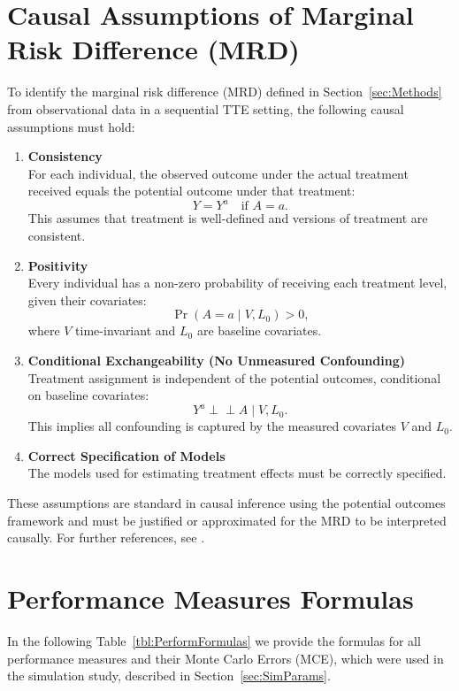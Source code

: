 \documentclass[pdflatex,sn-vancouver-ay]{sn-jnl}%
\theoremstyle{thmstyleone}%
\theoremstyle{thmstyletwo}%
\theoremstyle{thmstylethree}%
\begin{document}
\begin{appendices}
\pagebreak


\section{Causal Assumptions of Marginal Risk Difference (MRD)}\label{Apx:causalass}
To identify the marginal risk difference (MRD) defined in Section~\ref{sec:Methods} from observational data in a sequential TTE setting, the following causal assumptions must hold:

\begin{enumerate}
    \item \textbf{Consistency} \\
    For each individual, the observed outcome under the actual treatment received equals the potential outcome under that treatment:
    \[
    Y = Y^a \quad \text{if } A = a.
    \]
    This assumes that treatment is well-defined and versions of treatment are consistent.

    \item \textbf{Positivity} \\
    Every individual has a non-zero probability of receiving each treatment level, given their covariates:
    \[
    \Pr(A = a \mid V, L_0) > 0,
    \]
    where $V$ time-invariant and $L_0$ are baseline covariates.

    \item \textbf{Conditional Exchangeability (No Unmeasured Confounding)} \\
    Treatment assignment is independent of the potential outcomes, conditional on baseline covariates:
    \[
    Y^a \perp\!\!\!\perp A \mid V, L_0.
    \]
    This implies all confounding is captured by the measured covariates $V$ and $L_0$.

    \item \textbf{Correct Specification of Models} \\
    The models used for estimating treatment effects must be correctly specified.

\end{enumerate}

These assumptions are standard in causal inference using the potential outcomes framework and must be justified or approximated for the MRD to be interpreted causally. For further references, see \citep{hernanCausalInferenceWhat}.

\pagebreak

\section{Performance Measures Formulas}\label{Apx:PerformFormulas}
In the following Table~\ref{tbl:PerformFormulas} we provide the formulas for all performance measures and their Monte Carlo Errors (MCE), which were used in the simulation study, described in Section~\ref{sec:SimParams}.


\end{appendices}
\end{document}
